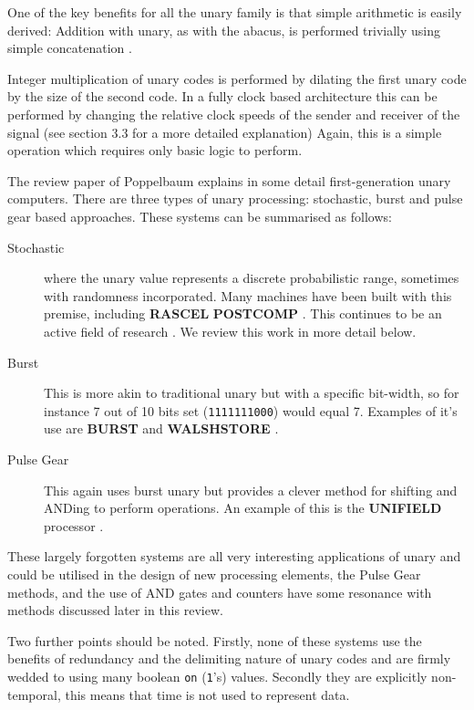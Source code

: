 \documentclass{article}
\begin{document}
One of the key benefits for all the unary family is that simple arithmetic is easily derived: Addition with unary, as with the abacus, is performed trivially using simple concatenation \cite{jonny1}.

Integer multiplication of unary codes is performed by dilating the first unary code by the size of the second code. In a fully clock based architecture this can be performed by changing the relative clock speeds of the sender and receiver of the signal (see \cite{jonny1} section 3.3 for a more detailed explanation)  Again, this is a simple operation which requires only basic logic to perform.

The review paper of Poppelbaum \cite{POPPELBAUM198747} explains in some detail first-generation unary computers. There are three types of unary processing: stochastic, burst and pulse gear based approaches. These systems can be summarised as follows:

\begin{description}
	\item[Stochastic] where the unary value represents a discrete probabilistic range, sometimes with randomness incorporated. Many machines have been built with this premise, including \textbf{RASCEL} \cite{esch1969rascel} \textbf{POSTCOMP} \cite{poppelbaum1967stochastic}. This continues to be an active field of research \cite{alaghi2013survey}. We review this work in more detail below.

	\item[Burst] This is more akin to traditional unary but with a specific bit-width, so for instance 7 out of 10 bits set (\texttt{1111111000}) would equal 7. Examples of it's use are \textbf{BURST} \cite{POPPELBAUM198747} and \textbf{WALSHSTORE} \cite{bracha1978walshstore}.
	\item[Pulse Gear] This again uses burst unary but provides a clever method for shifting and ANDing to perform operations. An example of this is the \textbf{UNIFIELD} processor \cite{dollas1987architecture}.
\end{description}


These largely forgotten systems are all very interesting applications of unary and could be utilised in the design of new processing elements, the Pulse Gear methods, and the use of AND gates and counters have some resonance with methods discussed later in this review.

Two further points should be noted. Firstly, none of these systems use the benefits of redundancy and the delimiting nature of unary codes and are firmly wedded to using many boolean \texttt{on} (\texttt{1}'s) values. Secondly they are explicitly non-temporal, this means that time is not used to represent data.
\end{document}
